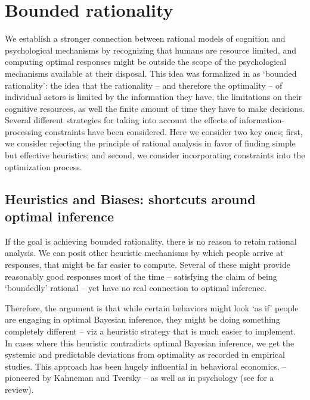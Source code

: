 \section{Bounded rationality}

We establish a stronger connection between rational models of cognition and psychological mechanisms by recognizing that humans are resource limited, and computing optimal responses might be outside the scope of the psychological mechanisms available at their disposal. This idea was formalized in \citet{simon1955behavioral} as `bounded rationality': the idea that the rationality -- and therefore the optimality -- of individual actors is limited by the information they have, the limitations on their cognitive resources, as well the finite amount of time they have to make decisions. Several different strategies for taking into account the effects of information-processing constraints have been considered. Here we consider two key ones; first, we consider rejecting the principle of rational analysis in favor of finding simple but effective heuristics; and second, we consider incorporating constraints into the optimization process.

\subsection{Heuristics and Biases: shortcuts around optimal inference}

If the goal is achieving bounded rationality, there is no reason to retain rational analysis. We can posit other heuristic mechanisms by which people arrive at responses, that might be far easier to compute. Several of these might provide reasonably good responses most of the time -- satisfying the claim of being `boundedly' rational -- yet have no real connection to optimal inference. 

Therefore, the argument is that while certain behaviors might look `as if' people are engaging in optimal Bayesian inference, they might be doing something completely different -- viz a heuristic strategy that is much easier to implement. In cases where this heuristic contradicts optimal Bayesian inference, we get the systemic and predictable deviations from optimality as recorded in empirical studies. This approach has been hugely influential in behavioral economics, -- pioneered by Kahneman and Tversky\cite{tversky} -- as well as in psychology (see \citet{gigerenzer2002bounded} for a review). 

